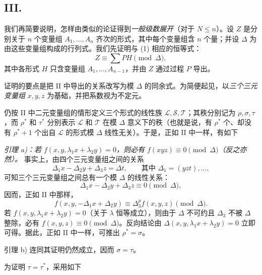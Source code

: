 \subsection*{III.}
我们再简要说明，怎样由类似的论证得到\emph{一般级数展开}（对于 $N\le n$）。设 $Z$ 是分别关于 $n$ 个变量组 $A_1,
\ldots,A_n$ 齐次的形式，其中每个变量组含 $n$ 个量；并设 $\Delta$ 为由这些变量组构成的行列式。我们先证明与 (1) 相应的恒等式：
\begin{equation}
  Z\equiv\sum PH \pmod{\Delta},
\tag{2}
\end{equation}
其中各形式 $H$ 只含变量组 $A_1,\ldots,A_{n-1}$，并由 $Z$ 通过过程 $P$ 导出。

证明的要点是把 II 中导出的关系改写为模 $\Delta$ 的同余式。为简便起见，以\emph{三个三元变量组} $x,y,z$ 为基础，并把系数视为不定元。

仍按 II 中二元变量组的情形定义三个形式的线性族 $\mathcal L,\mathcal S,\mathcal T$；其秩分别记为 $\rho,\sigma,\tau$，而 $\rho^*$ 和 $\tau^*$ 分别表示 $\mathcal L$ 和 $\mathcal T$ 在模 $\Delta$ 意义下的秩（也就是说，有 $\rho^*$ 个、却没有 $\rho^*+1$ 个出自 $\mathcal L$ 的形式模 $\Delta$ 线性无关）。于是，正如 II 中一样，有如下

\emph{引理 a)：若 $f(x,y,\lambda_1x+\lambda_2y)=0$，则必有 $f(xyz)\equiv0\pmod{\Delta}$（反之亦然）。} 事实上，由四个三元变量组之间的关系
\[
  \Delta_1x-\Delta_2y+\Delta_3z=\Delta t,
  \qquad \text{其中 }\Delta_1=(yzt),\ldots,
\]
可知三个三元变量组之间总有一个模 $\Delta$ 的线性关系：
\[
  \Delta_1x-\Delta_2y+\Delta_3z\equiv0\pmod{\Delta},
\]
因而，正如 II 中那样，
\[
  f(x,y,-\Delta_1x+\Delta_2y)\equiv\Delta_3^p f(x,y,z)\pmod{\Delta}.
\]
若 $f(x,y,\lambda_1x+\lambda_2y)=0$（关于 $\lambda$ 恒等成立），则由于 $\Delta$ 不可约且 $\Delta_3$ 不被 $\Delta$ 整除，必有 $f(x,y,z)\equiv0\pmod{\Delta}$。反向结论由 $\Delta(x,y,\lambda_1x+\lambda_2y)=0$ 立即可得。据此，正如 II 中一样，可推出 $\rho^*=\sigma$。

引理 b) 连同其证明仍然成立，因而 $\sigma=\tau$。

为证明 $\tau=\tau^*$，采用如下

